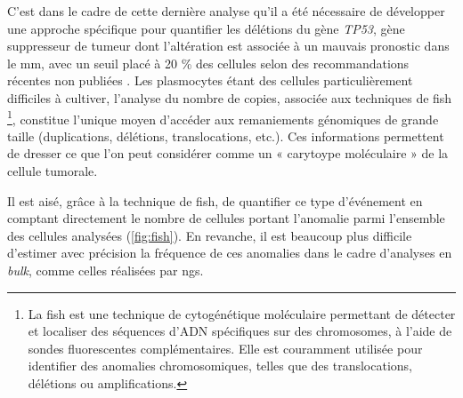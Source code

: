 \vspace{1em}

C'est dans le cadre de cette dernière analyse qu'il a été nécessaire de
développer une approche spécifique pour quantifier les délétions du gène
\textit{TP53}, gène suppresseur de tumeur dont l'altération est associée à un
mauvais pronostic dans le \gls{mm}, avec un seuil placé à 20 \% des cellules
selon des recommandations récentes non publiées
\cite{flyntPrognosisBiologyTargeting2020}. Les plasmocytes étant des cellules
particulièrement difficiles à cultiver, l'analyse du nombre de copies, associée
aux techniques de \gls{fish} \footnote{La \gls{fish} est une technique de
cytogénétique moléculaire permettant de détecter et localiser des séquences
d'ADN spécifiques sur des chromosomes, à l'aide de sondes fluorescentes
complémentaires. Elle est couramment utilisée pour identifier des anomalies
chromosomiques, telles que des translocations, délétions ou amplifications.},
constitue l'unique moyen d'accéder aux remaniements génomiques de grande taille
(duplications, délétions, translocations, etc.). Ces informations permettent de
dresser ce que l'on peut considérer comme un « carytoype moléculaire » de la
cellule tumorale.

\vspace{1em}

Il est aisé, grâce à la technique de \gls{fish}, de quantifier ce type
d'événement en comptant directement le nombre de cellules portant l'anomalie
parmi l'ensemble des cellules analysées (\autoref{fig:fish}). En revanche, il
est beaucoup plus difficile d'estimer avec précision la fréquence de ces
anomalies dans le cadre d'analyses en \textit{bulk}, comme celles réalisées par
\gls{ngs}.

